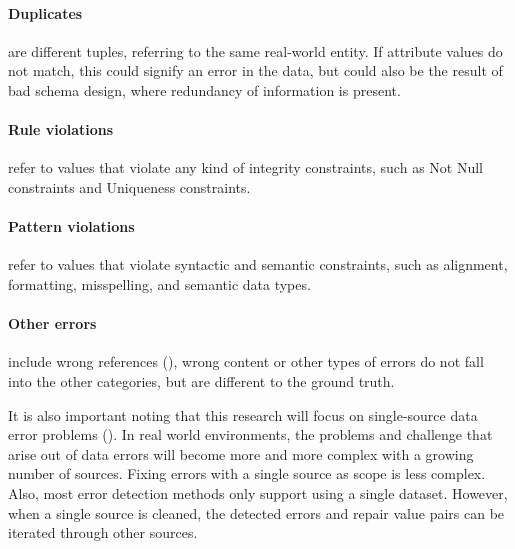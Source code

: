 \paragraph{Duplicates} are different tuples, referring to the same real-world entity. If attribute values do not match, this could signify an error in the data, but could also be the result of bad schema design, where redundancy of information is present.

\paragraph{Rule violations} refer to values that violate any kind of integrity constraints, such as Not Null constraints and Uniqueness constraints.

\paragraph{Pattern violations} refer to values that violate syntactic and semantic constraints, such as alignment, formatting, misspelling, and semantic data types.

\paragraph{Other errors} include wrong references (\cite{Rahm2000-fz}), wrong content or other types of errors do not fall into the other categories, but are different to the ground truth.

It is also important noting that this research will focus on single-source data error problems (\cite{Rahm2000-fz}). In real world environments, the problems and challenge that arise out of data errors will become more and more complex with a growing number of sources. Fixing errors with a single source as scope is less complex. Also, most error detection methods only support using a single dataset. However, when a single source is cleaned, the detected errors and repair value pairs can be iterated through other sources.


